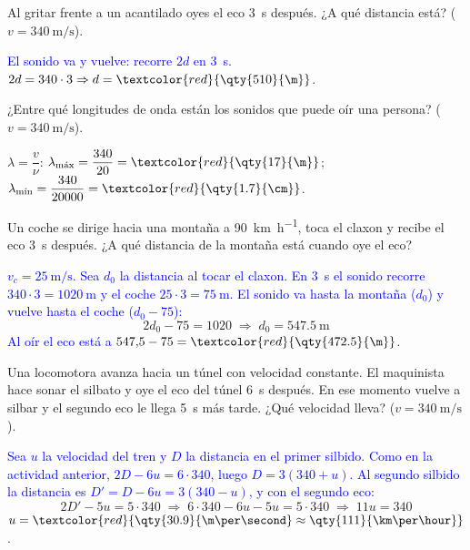 \begin{exercise}
    Al gritar frente a un acantilado oyes el eco \qty{3}{\second} después. ¿A qué distancia está? (\(v = \qty{340}{\m\per\second}\)).
    \begin{solu}
        \textcolor{blue}{El sonido va y vuelve: recorre \(2d\) en \qty{3}{\second}.}
        \(2d = 340\cdot 3 \Rightarrow d = \textcolor{red}{\qty{510}{\m}}\).
    \end{solu}
\end{exercise}

\begin{exercise}
    ¿Entre qué longitudes de onda están los sonidos que puede oír una persona? (\(v = \qty{340}{\m\per\second}\)).
    \begin{solu}
        \(\lambda = \dfrac{v}{\nu}\): \(\lambda_{\text{máx}} = \dfrac{340}{20} = \textcolor{red}{\qty{17}{\m}}\);
        \(\lambda_{\text{mín}} = \dfrac{340}{20000} = \textcolor{red}{\qty{1.7}{\cm}}\).
    \end{solu}
\end{exercise}

\begin{exercise}
    Un coche se dirige hacia una montaña a \qty{90}{\km\per\hour}, toca el claxon y recibe el eco \qty{3}{\second} después.
    ¿A qué distancia de la montaña está cuando oye el eco?
    \begin{solu}
        \textcolor{blue}{\(v_c = \qty{25}{\m\per\second}\). Sea \(d_0\) la distancia al tocar el claxon. En \qty{3}{\second} el
        sonido recorre \(340\cdot 3 = \qty{1020}{\m}\) y el coche \(25\cdot 3 = \qty{75}{\m}\). El sonido va hasta la montaña
        (\(d_0\)) y vuelve hasta el coche (\(d_0 - 75\)):}
        \[ 2d_0 - 75 = 1020 \;\Rightarrow\; d_0 = \qty{547.5}{\m} \]
        \textcolor{blue}{Al oír el eco está a} \(547{,}5 - 75 = \textcolor{red}{\qty{472.5}{\m}}\).
    \end{solu}
\end{exercise}

\begin{exercise}
    Una locomotora avanza hacia un túnel con velocidad constante. El maquinista hace sonar el silbato y oye el eco del
    túnel \qty{6}{\second} después. En ese momento vuelve a silbar y el segundo eco le llega \qty{5}{\second} más tarde.
    ¿Qué velocidad lleva? (\(v = \qty{340}{\m\per\second}\)).
    \begin{solu}
        \textcolor{blue}{Sea \(u\) la velocidad del tren y \(D\) la distancia en el primer silbido. Como en la actividad
        anterior, \(2D - 6u = 6\cdot 340\), luego \(D = 3(340 + u)\). Al segundo silbido la distancia es
        \(D' = D - 6u = 3(340 - u)\), y con el segundo eco:}
        \[ 2D' - 5u = 5\cdot 340 \;\Rightarrow\; 6\cdot 340 - 6u - 5u = 5\cdot 340 \;\Rightarrow\; 11u = 340 \]
        \(u = \textcolor{red}{\qty{30.9}{\m\per\second} \approx \qty{111}{\km\per\hour}}\).
    \end{solu}
\end{exercise}

